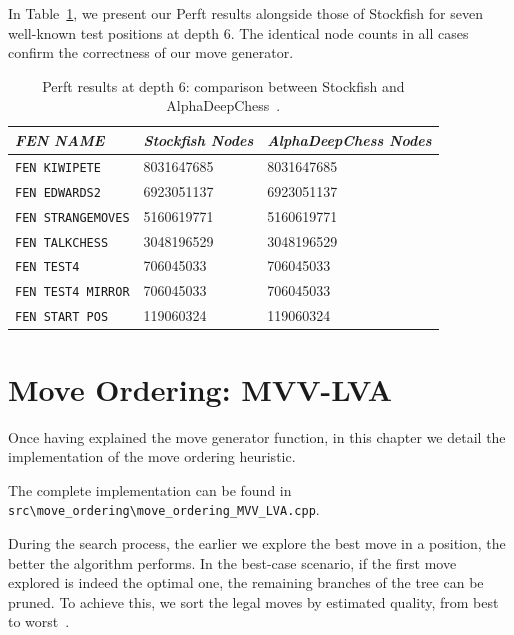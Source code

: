 \vspace{1em}

\noindent In Table~\ref{tab:perftResults}, we present our Perft results alongside those of Stockfish for seven well-known test positions at depth 6. The identical node counts in all cases confirm the correctness of our move generator.

\begin{table}[H]
    \centering
    \begin{tabular}{|l|l|l|}
    \hline
    \textit{FEN NAME} & \textit{Stockfish Nodes} & \textit{AlphaDeepChess Nodes} \\
    \hline
    \texttt{FEN KIWIPETE}       &  8031647685 &  8031647685   \\
    \texttt{FEN EDWARDS2}       &  6923051137 &  6923051137   \\
    \texttt{FEN STRANGEMOVES}   &  5160619771 &  5160619771   \\
    \texttt{FEN TALKCHESS}      &  3048196529 &  3048196529   \\
    \texttt{FEN TEST4}          &  706045033  &  706045033    \\
    \texttt{FEN TEST4 MIRROR}   &  706045033  &  706045033    \\
    \texttt{FEN START POS}      &  119060324  &  119060324    \\
    \hline
    \end{tabular}
    \caption{Perft results at depth 6: comparison between Stockfish and AlphaDeepChess~\cite{PerftResults}.}
    \label{tab:perftResults}
\end{table}

\section{Move Ordering: MVV-LVA}
 
Once having explained the move generator function, in this chapter we detail the implementation of the move ordering heuristic.

\vspace{1em}

\noindent \parbox{\textwidth}{The complete implementation can be found in \texttt{src\textbackslash{}move\_ordering\textbackslash{}move\_ordering\_MVV\_LVA.cpp}.}

\vspace{1em}

\noindent During the search process, the earlier we explore the best move in a position, the better the algorithm performs. In the best-case scenario, if the first move explored is indeed the optimal one, the remaining branches of the tree can be pruned. To achieve this, we sort the legal moves by estimated quality, from best to worst~\cite{MoveOrdering}.

